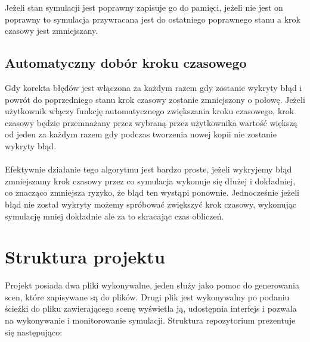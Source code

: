 \documentclass[12pt, letterpaper]{report}
\begin{document}
    Jeżeli stan symulacji jest poprawny zapisuje go do pamięci, jeżeli nie jest on poprawny to symulacja 
    przywracana jest do ostatniego poprawnego stanu a krok czasowy jest zmniejszany.

    \subsection{Automatyczny dobór kroku czasowego}
    Gdy korekta błędów jest włączona za każdym razem gdy zostanie wykryty błąd i powrót do poprzedniego stanu
    krok czasowy zostanie zmniejszony o połowę. Jeżeli użytkownik włączy funkcję automatycznego zwiększania
    kroku czasowego, krok czasowy będzie przemnażany przez wybraną przez użytkownika wartość większą od 
    jeden za każdym razem gdy podczas tworzenia nowej kopii nie zostanie wykryty błąd. \\ \\
    
    Efektywnie działanie tego algorytmu jest bardzo proste, jeżeli wykryjemy błąd zmniejszamy krok czasowy
    przez co symulacja wykonuje się dłużej i dokładniej, co znacząco zmniejsza ryzyko, że błąd
    ten wystąpi ponownie. Jednocześnie jeżeli błąd nie został wykryty możemy spróbować zwiększyć 
    krok czasowy, wykonując symulację mniej dokładnie ale za to skracając czas obliczeń.

    \clearpage
    \section{Struktura projektu}
    Projekt posiada dwa pliki wykonywalne, jeden służy jako pomoc do generowania scen, które zapisywane są 
    do plików. Drugi plik jest wykonywalny po podaniu ścieżki do pliku zawierającego scenę wyświetla ją, 
    udostępnia interfejs i pozwala na wykonywanie i monitorowanie symulacji. Struktura repozytorium
    prezentuje się następująco: \\

\end{document}
